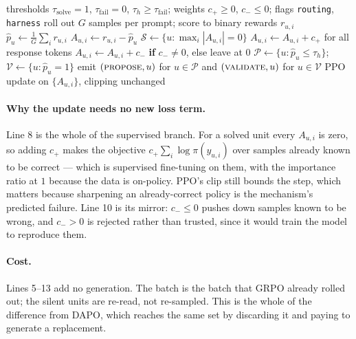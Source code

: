 \begin{algorithm}[t]
\caption{Per-batch signal routing. $\mathcal{B}$ is a batch of prompts, $G$ samples each.}
\label{alg:route}
\begin{algorithmic}[1]
\Require thresholds $\tau_{\text{solve}}{=}1$, $\tau_{\text{fail}}{=}0$, $\tau_h \ge \tau_{\text{fail}}$;
         weights $c_+ \ge 0$, $c_- \le 0$; flags \texttt{routing}, \texttt{harness}
\State roll out $G$ samples per prompt; score to binary rewards $r_{u,i}$
\State $\hat p_u \gets \frac{1}{G}\sum_i r_{u,i}$ 
\State $A_{u,i} \gets r_{u,i} - \hat p_u$ 
\State $\mathcal{S} \gets \{u : \max_i |A_{u,i}| = 0\}$ 
     
      \State $A_{u,i} \gets A_{u,i} + c_+$ for all response tokens
     
      \State $A_{u,i} \gets A_{u,i} + c_-$ \textbf{if} $c_- \neq 0$, else leave at $0$
    \EndIf
  \EndFor
\EndIf
{}
  \State $\mathcal{P} \gets \{u : \hat p_u \le \tau_h\}$; \; $\mathcal{V} \gets \{u : \hat p_u = 1\}$
  \State emit $(\textsc{propose}, u)$ for $u \in \mathcal{P}$ and $(\textsc{validate}, u)$ for $u \in \mathcal{V}$
\EndIf
\State PPO update on $\{A_{u,i}\}$, clipping unchanged
\end{algorithmic}
\end{algorithm}

\paragraph{Why the update needs no new loss term.} Line 8 is the whole of the supervised
branch. For a solved unit every $A_{u,i}$ is zero, so adding $c_+$ makes the objective
$c_+\sum_i \log \pi(y_{u,i})$ over samples already known to be correct --- which is supervised
fine-tuning on them, with the importance ratio at $1$ because the data is on-policy. PPO's
clip still bounds the step, which matters because sharpening an already-correct policy is the
mechanism's predicted failure. Line 10 is its mirror: $c_- \le 0$ pushes down samples known to
be wrong, and $c_- > 0$ is rejected rather than trusted, since it would train the model to
reproduce them.

\paragraph{Cost.} Lines 5--13 add no generation. The batch is the batch that GRPO already
rolled out; the silent units are re-read, not re-sampled. This is the whole of the difference
from DAPO, which reaches the same set by discarding it and paying to generate a replacement.


